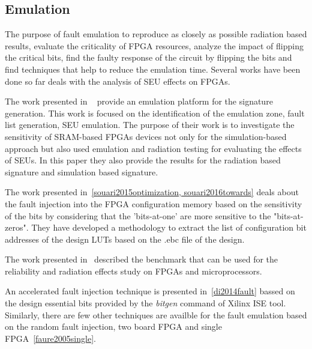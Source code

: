 \subsection{Emulation}

The purpose of fault emulation to reproduce as closely as possible radiation based results, evaluate the criticality of FPGA resources, analyze the impact of flipping the critical bits, find the faulty response of the circuit by flipping the bits and find techniques that help to reduce the emulation time. Several works have been done so far deals with the analysis of SEU effects on FPGAs.

The work presented in ~\cite{hobeika2014multi} provide an emulation platform for the signature generation. This work is focused on the identification of the emulation zone,  fault list generation, SEU emulation. The purpose of their work is to investigate the sensitivity of SRAM-based FPGAs devices not only for the simulation-based approach but also used emulation and radiation testing for evaluating the effects of SEUs. In this paper they also provide the results for the radiation based signature and simulation based signature. 

The work presented in~\ref{souari2015optimization, souari2016towards} deals about the fault injection into the FPGA configuration memory based on the sensitivity of the bits by considering that the 'bits-at-one' are more sensitive to the "bits-at-zeros". They have developed a methodology to extract the list of configuration bit addresses of the design LUTs based on the .ebc file of the design.

The work presented in~\cite{quinn2015using} described the benchmark that can be used for the reliability and radiation effects study on FPGAs and microprocessors. 

An accelerated fault injection technique is presented in~\ref{di2014fault} bassed on the design essential bits provided by the \textit{bitgen} command of Xilinx ISE tool. Similarly, there are few other techniques are availble for the fault emulation based on the random fault injection, two board FPGA and single FPGA~\ref{faure2005single}.










